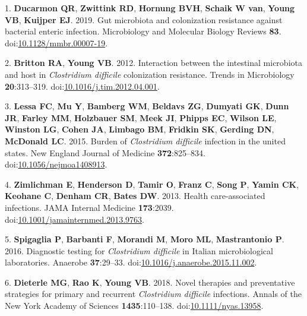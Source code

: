 \documentclass[11pt,]{article}
\newlength{\cslhangindent}
\newenvironment{cslreferences}%
  {\setlength{\parindent}{0pt}%
  \everypar{\setlength{\hangindent}{\cslhangindent}}\ignorespaces}%
  {\par}
\begin{document}
\hypertarget{refs}{}
\begin{cslreferences}
\leavevmode\hypertarget{ref-ducarmon2019}{}%
1. \textbf{Ducarmon QR}, \textbf{Zwittink RD}, \textbf{Hornung BVH},
\textbf{Schaik W van}, \textbf{Young VB}, \textbf{Kuijper EJ}. 2019. Gut
microbiota and colonization resistance against bacterial enteric
infection. Microbiology and Molecular Biology Reviews \textbf{83}.
doi:\href{https://doi.org/10.1128/mmbr.00007-19}{10.1128/mmbr.00007-19}.

\leavevmode\hypertarget{ref-britton2012}{}%
2. \textbf{Britton RA}, \textbf{Young VB}. 2012. Interaction between the
intestinal microbiota and host in \emph{Clostridium difficile}
colonization resistance. Trends in Microbiology \textbf{20}:313--319.
doi:\href{https://doi.org/10.1016/j.tim.2012.04.001}{10.1016/j.tim.2012.04.001}.

\leavevmode\hypertarget{ref-lessa2015}{}%
3. \textbf{Lessa FC}, \textbf{Mu Y}, \textbf{Bamberg WM},
\textbf{Beldavs ZG}, \textbf{Dumyati GK}, \textbf{Dunn JR},
\textbf{Farley MM}, \textbf{Holzbauer SM}, \textbf{Meek JI},
\textbf{Phipps EC}, \textbf{Wilson LE}, \textbf{Winston LG},
\textbf{Cohen JA}, \textbf{Limbago BM}, \textbf{Fridkin SK},
\textbf{Gerding DN}, \textbf{McDonald LC}. 2015. Burden of
\emph{Clostridium difficile} infection in the united states. New England
Journal of Medicine \textbf{372}:825--834.
doi:\href{https://doi.org/10.1056/nejmoa1408913}{10.1056/nejmoa1408913}.

\leavevmode\hypertarget{ref-zimlichman2013}{}%
4. \textbf{Zimlichman E}, \textbf{Henderson D}, \textbf{Tamir O},
\textbf{Franz C}, \textbf{Song P}, \textbf{Yamin CK}, \textbf{Keohane
C}, \textbf{Denham CR}, \textbf{Bates DW}. 2013. Health care-associated
infections. JAMA Internal Medicine \textbf{173}:2039.
doi:\href{https://doi.org/10.1001/jamainternmed.2013.9763}{10.1001/jamainternmed.2013.9763}.

\leavevmode\hypertarget{ref-spigaglia2016}{}%
5. \textbf{Spigaglia P}, \textbf{Barbanti F}, \textbf{Morandi M},
\textbf{Moro ML}, \textbf{Mastrantonio P}. 2016. Diagnostic testing for
\emph{Clostridium difficile} in Italian microbiological laboratories.
Anaerobe \textbf{37}:29--33.
doi:\href{https://doi.org/10.1016/j.anaerobe.2015.11.002}{10.1016/j.anaerobe.2015.11.002}.

\leavevmode\hypertarget{ref-dieterle2019}{}%
6. \textbf{Dieterle MG}, \textbf{Rao K}, \textbf{Young VB}. 2018. Novel
therapies and preventative strategies for primary and recurrent
\emph{Clostridium difficile} infections. Annals of the New York Academy
of Sciences \textbf{1435}:110--138.
doi:\href{https://doi.org/10.1111/nyas.13958}{10.1111/nyas.13958}.


\end{cslreferences}
\end{document}
